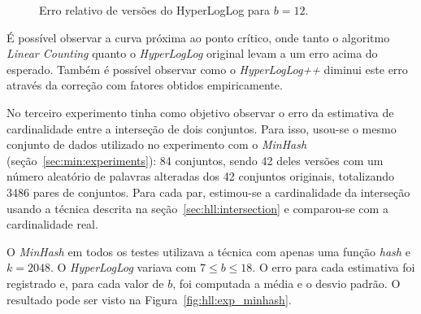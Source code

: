 \begin{figure}[!htbp]
\centering
{}
\caption{Erro relativo de versões do HyperLogLog para $b=12$.}
\label{fig:hll:exp_plusplus}
\end{figure}
    
É possível observar a curva próxima ao ponto crítico, onde tanto o algoritmo \emph{Linear Counting} quanto o \emph{HyperLogLog} original levam a um erro acima do esperado. Também é possível observar como o \emph{HyperLogLog++} diminui este erro através da correção com fatores obtidos empiricamente.

No terceiro experimento tinha como objetivo observar o erro da estimativa de cardinalidade entre a interseção de dois conjuntos. Para isso, usou-se o mesmo conjunto de dados utilizado no experimento com o \emph{MinHash} (seção~\ref{sec:min:experiments}): 84 conjuntos, sendo 42 deles versões com um número aleatório de palavras alteradas dos 42 conjuntos originais, totalizando 3486 pares de conjuntos. Para cada par, estimou-se a cardinalidade da interseção usando a técnica descrita na seção~\ref{sec:hll:intersection} e comparou-se com a cardinalidade real. 

O \emph{MinHash} em todos os testes utilizava a técnica com apenas uma função \emph{hash} e $k = 2048$. O \emph{HyperLogLog} variava com $7 \leq b \leq 18$. O erro para cada estimativa foi registrado e, para cada valor de $b$, foi computada a média e o desvio padrão. O resultado pode ser visto na Figura~\ref{fig:hll:exp_minhash}.

